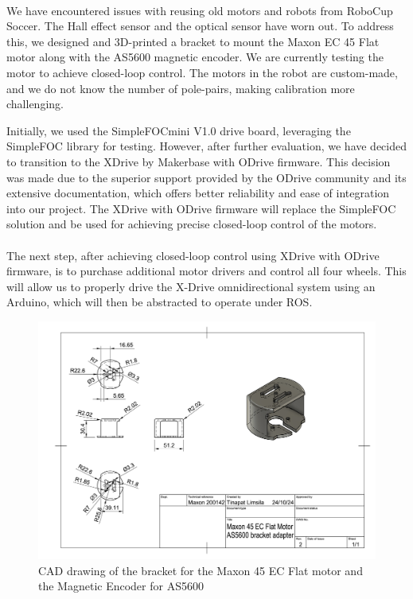 \paragraph*{}
We have encountered issues with reusing old motors and robots from RoboCup Soccer. The Hall effect sensor and the optical sensor have worn out. To address this, we designed and 3D-printed a bracket to mount the Maxon EC 45 Flat motor along with the AS5600 magnetic encoder. We are currently testing the motor to achieve closed-loop control. The motors in the robot are custom-made, and we do not know the number of pole-pairs, making calibration more challenging. 

Initially, we used the SimpleFOCmini V1.0 drive board, leveraging the SimpleFOC library for testing. However, after further evaluation, we have decided to transition to the XDrive by Makerbase with ODrive firmware. This decision was made due to the superior support provided by the ODrive community and its extensive documentation, which offers better reliability and ease of integration into our project. The XDrive with ODrive firmware will replace the SimpleFOC solution and be used for achieving precise closed-loop control of the motors.

\paragraph*{}
The next step, after achieving closed-loop control using XDrive with ODrive  firmware, is to purchase additional motor drivers and control all four wheels. This will allow us to properly drive the X-Drive omnidirectional system using an Arduino, which will then be abstracted to operate under ROS.
\begin{figure}
    \centering
    \includegraphics[width=1\linewidth]{assets/images/hardware/Maxon 45 EC Flat Motor AS5600 bracket adapter Drawing v1.png}
    \caption{CAD drawing of the bracket for the Maxon 45 EC Flat motor and the Magnetic Encoder for AS5600}
    \label{fig:enter-label}
\end{figure}